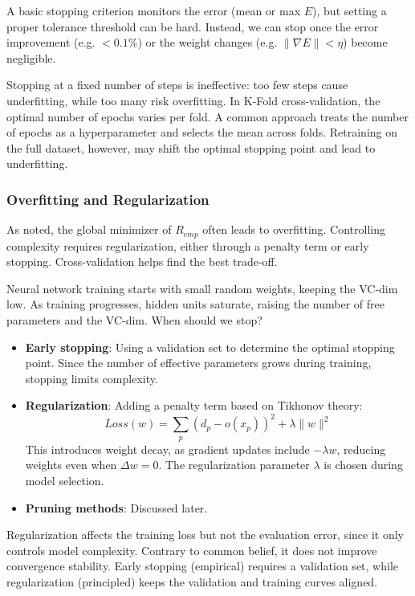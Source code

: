 A basic stopping criterion monitors the error (mean or max $E$), but setting a proper tolerance threshold can be hard. Instead, we can stop once the error improvement (e.g. $<0.1\%$) or the weight changes (e.g. $\|\nabla E\| < \eta$) become negligible.

Stopping at a fixed number of steps is ineffective: too few steps cause underfitting, while too many risk overfitting. In K-Fold cross-validation, the optimal number of epochs varies per fold. A common approach treats the number of epochs as a hyperparameter and selects the mean across folds. Retraining on the full dataset, however, may shift the optimal stopping point and lead to underfitting.


\subsubsection{Overfitting and Regularization}

As noted, the global minimizer of $R_{emp}$ often leads to overfitting. Controlling complexity requires regularization, either through a penalty term or early stopping. Cross-validation helps find the best trade-off.

Neural network training starts with small random weights, keeping the VC-dim low. As training progresses, hidden units saturate, raising the number of free parameters and the VC-dim. When should we stop?

\begin{itemize}
    \item \textbf{Early stopping}: Using a validation set to determine the optimal stopping point. Since the number of effective parameters grows during training, stopping limits complexity.
    
    \item \textbf{Regularization}: Adding a penalty term based on Tikhonov theory:
    \begin{equation*}
        Loss(w) = \sum_p (d_p - o(x_p))^2 + \lambda\|w\|^2
    \end{equation*}
    This introduces weight decay, as gradient updates include $- \lambda w$, reducing weights even when $\Delta w = 0$. The regularization parameter $\lambda$ is chosen during model selection.

    \item \textbf{Pruning methods}: Discussed later.
\end{itemize}

Regularization affects the training loss but not the evaluation error, since it only controls model complexity. Contrary to common belief, it does not improve convergence stability. Early stopping (empirical) requires a validation set, while regularization (principled) keeps the validation and training curves aligned.


